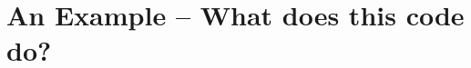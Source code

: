 \documentclass{beamer}
\begin{document}
\section{An Example -- What does this code do?}
\begin{frame}
  \frametitle{\insertsection}

  

\end{frame}
\end{document}
